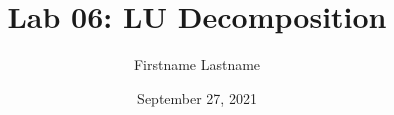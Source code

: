 \newcommand{\course}{MATH 3341}
\title{Lab 06: LU Decomposition}
\author{Firstname Lastname}
\date{September 27, 2021}
